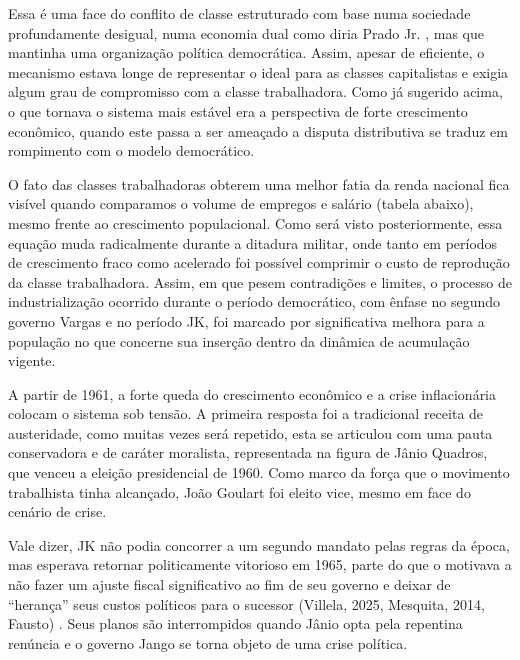 Essa é uma face do conflito de classe estruturado com base numa
sociedade profundamente desigual, numa economia dual como diria Prado Jr.
\citep{pradojunior2012}, mas que mantinha uma organização política democrática. Assim,
apesar de eficiente, o mecanismo estava longe de representar o ideal
para as classes capitalistas e exigia algum grau de compromisso com a
classe trabalhadora. Como já sugerido acima, o que tornava o sistema
mais estável era a perspectiva de forte crescimento econômico, quando
este passa a ser ameaçado a disputa distributiva se traduz em rompimento
com o modelo democrático.

O fato das classes trabalhadoras obterem uma melhor fatia da renda
nacional fica visível quando comparamos o volume de empregos e salário
(tabela abaixo), mesmo frente ao crescimento populacional. Como será
visto posteriormente, essa equação muda radicalmente durante a ditadura
militar, onde tanto em períodos de crescimento fraco como acelerado foi
possível comprimir o custo de reprodução da classe trabalhadora. Assim,
em que pesem contradições e limites, o processo de industrialização
ocorrido durante o período democrático, com ênfase no segundo governo
Vargas e no período JK, foi marcado por significativa melhora para a
população no que concerne sua inserção dentro da dinâmica de acumulação
vigente.

A partir de 1961, a forte queda do crescimento econômico e a crise
inflacionária colocam o sistema sob tensão. A primeira resposta foi a
tradicional receita de austeridade, como muitas vezes será repetido,
esta se articulou com uma pauta conservadora e de caráter moralista,
representada na figura de Jânio Quadros, que venceu a eleição
presidencial de 1960. Como marco da força que o movimento trabalhista
tinha alcançado, João Goulart foi eleito vice, mesmo em face do cenário
de crise.

Vale dizer, JK não podia concorrer a um segundo mandato pelas regras da
época, mas esperava retornar politicamente vitorioso em 1965, parte do
que o motivava a não fazer um ajuste fiscal significativo ao fim de seu
governo e deixar de ``herança'' seus custos políticos para o sucessor
(Villela, 2025, Mesquita, 2014, Fausto) . Seus planos são interrompidos quando Jânio opta
pela repentina renúncia e o governo Jango se torna objeto de uma crise
política.

